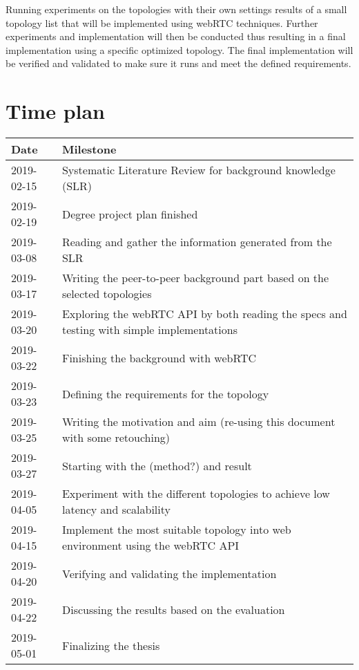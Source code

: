 \documentclass[12pt]{article}
\begin{document}
\noindent Running experiments on the topologies with their own settings results of 
a small topology list that will be implemented using webRTC techniques. 
Further experiments and implementation will then be conducted thus resulting
in a final implementation using a specific optimized topology. The final 
implementation will be verified and validated to make sure it runs and 
meet the defined requirements. 


\section*{Time plan}
\begin{tabular} {|p{2.6cm}|p{10.2cm}|} \hline
\textbf{Date} & \textbf{Milestone} \\ \hline
2019-02-15 & Systematic Literature Review for background knowledge (SLR)\\ \hline
2019-02-19 & Degree project plan finished \\ \hline
2019-03-08 & Reading and gather the information generated from the SLR \\ \hline
2019-03-17 & Writing the peer-to-peer background part based on the selected topologies \\ \hline
2019-03-20 & Exploring the webRTC API by both reading the specs and testing with simple implementations  \\ \hline
2019-03-22 & Finishing the background with webRTC \\ \hline
2019-03-23 & Defining the requirements for the topology \\ \hline
2019-03-25 & Writing the motivation and aim (re-using this document with some retouching) \\ \hline
2019-03-27 & Starting with the (method?) and result \\ \hline
2019-04-05 & Experiment with the different topologies to achieve low latency and scalability \\ \hline
2019-04-15 & Implement the most suitable topology into web environment using the webRTC API \\ \hline
2019-04-20 & Verifying and validating the implementation  \\ \hline
2019-04-22 & Discussing the results based on the evaluation  \\ \hline
2019-05-01 & Finalizing the thesis  \\ \hline
\end{tabular}

\pagebreak


\end{document}
